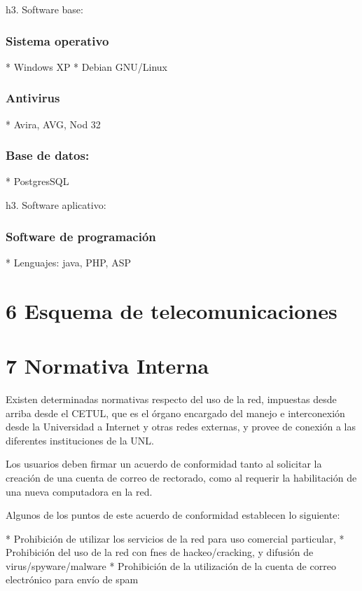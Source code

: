 \documentclass[a4paper,11pt,oneside]{article}
\begin{document}
h3. Software base:

\subsubsection*{Sistema operativo}
 
* Windows XP 
* Debian GNU/Linux

\subsubsection*{Antivirus}

* Avira, AVG, Nod 32

\subsubsection*{Base de datos:}

* PostgresSQL

h3. Software aplicativo:

\subsubsection*{Software de programación}

* Lenguajes: java, PHP, ASP

\section*{6 Esquema de telecomunicaciones}

\section*{7 Normativa Interna}

Existen determinadas normativas respecto del uso de la red, impuestas desde arriba desde el CETUL, que es el órgano encargado del manejo e interconexión desde la Universidad a Internet y otras redes externas, y provee de conexión a las diferentes instituciones de la UNL.

Los usuarios deben firmar un acuerdo de conformidad tanto al solicitar la creación de una cuenta de correo de rectorado, como al requerir la habilitación de una nueva computadora en la red.

Algunos de los puntos de este acuerdo de conformidad establecen lo siguiente:

 * Prohibición de utilizar los servicios de la red para uso comercial particular,
 * Prohibición del uso de la red con fnes de hackeo/cracking, y difusión de virus/spyware/malware
 * Prohibición de la utilización de la cuenta de correo electrónico para envío de spam
\end{document}
